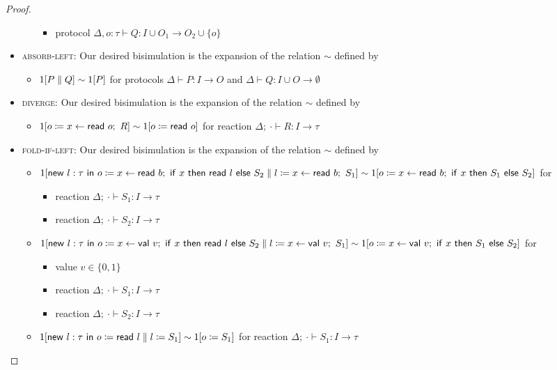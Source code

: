 \begin{proof}
\begin{itemize}
\begin{itemize}
\begin{itemize}
\item protocol $\Delta, o : \tau \vdash Q : I \cup O_1 \to O_2 \cup \{o\}$
\end{itemize}
\end{itemize}
\item \textsc{absorb-left}: Our desired bisimulation is the expansion of the relation $\sim$ defined by
\begin{itemize}
\item $1[P \; \| \; Q] \sim 1[P]$ for protocols $\Delta \vdash P : I \to O$ and $\Delta \vdash Q : I \cup O \to \emptyset$
\end{itemize}
\item \textsc{diverge}: Our desired bisimulation is the expansion of the relation $\sim$ defined by
\begin{itemize}
\item $1[\assign{o}{x \leftarrow \read{o}; \ R}] \sim 1[\assign{o}{\read{o}}]$ for reaction $\Delta; \ \cdot \vdash R : I \to \tau$
\end{itemize}
\item \textsc{fold-if-left}: Our desired bisimulation is the expansion of the relation $\sim$ defined by
\begin{itemize}
\item $1[\new{l}{\tau}{\Par{\assign{o}{x \leftarrow \read{b}; \ \ifte{x}{\read{l}}}{S_2}}{\assign{l}{x \leftarrow \read{b}; \ S_1}}}] \sim \\ 1[\assign{o}{x \leftarrow \read{b}; \ \ifte{x}{S_1}{S_2}}]$ for
\begin{itemize}
\item reaction $\Delta; \ \cdot \vdash S_1 : I \to \tau$
\item reaction $\Delta; \ \cdot \vdash S_2 : I \to \tau$
\end{itemize}
\item $1[\new{l}{\tau}{\Par{\assign{o}{x \leftarrow \val{v}; \ \ifte{x}{\read{l}}}{S_2}}{\assign{l}{x \leftarrow \val{v}; \ S_1}}}] \sim \\ 1[\assign{o}{x \leftarrow \val{v}; \ \ifte{x}{S_1}{S_2}}]$ for
\begin{itemize}
\item value $v \in \{0,1\}$
\item reaction $\Delta; \ \cdot \vdash S_1 : I \to \tau$
\item reaction $\Delta; \ \cdot \vdash S_2 : I \to \tau$
\end{itemize}
\item $1[\mathsf{new} \ l : \tau \ \mathsf{in} \ o \coloneqq \mathsf{read} \ l \; \| \; l \coloneqq S_1] \sim 1[o \coloneqq S_1]$ for reaction $\Delta; \ \cdot \vdash S_1 : I \to \tau$

\end{itemize}
\end{itemize}
\end{proof}
